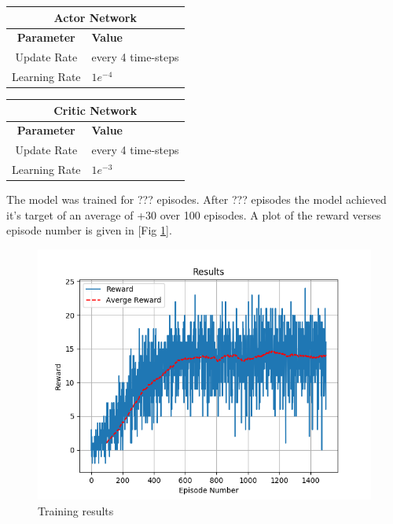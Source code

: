 \documentclass[12pt]{article}
\begin{document}
\begin{table}
\begin{minipage}{.5\linewidth}
\begin{tabular}{|c|l|}
	\hline
	\multicolumn{2}{|c|}{\textbf{Actor Network}}\\
	\hline
	\hline
	\textbf{Parameter} & \textbf{Value}\\
	\hline
		Update Rate & every 4 time-steps \\
		Learning Rate & $1e^{-4}$ \\
	\hline
\end{tabular}
\end{minipage}
\begin{minipage}{.5\linewidth}
\begin{tabular}{|c|l|}
	\hline
	\multicolumn{2}{|c|}{\textbf{Critic Network}}\\
	\hline
	\hline
	\textbf{Parameter} & \textbf{Value}\\
	\hline
		Update Rate & every 4 time-steps \\
		Learning Rate & $1e^{-3}$ \\
	\hline
\end{tabular}
\end{minipage}
\end{table}

The model was trained for ??? episodes. 
After ??? episodes the model achieved it's target of an average of +30 over 100 episodes.
A plot of the reward verses episode number is given in [Fig \ref{results}].

\begin{figure}
	\centering
	\includegraphics[width=0.8\linewidth]{./img/Results.png}
	\caption{Training results}
	\label{results}
\end{figure}
\end{document}
